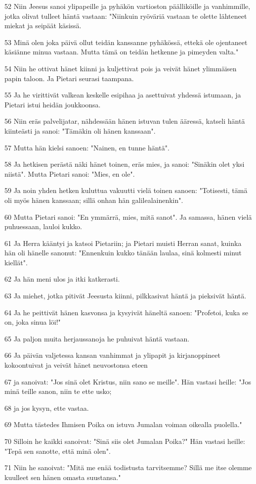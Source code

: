 \par 52 Niin Jeesus sanoi ylipapeille ja pyhäkön vartioston päälliköille ja vanhimmille, jotka olivat tulleet häntä vastaan: "Niinkuin ryöväriä vastaan te olette lähteneet miekat ja seipäät käsissä.
\par 53 Minä olen joka päivä ollut teidän kanssanne pyhäkössä, ettekä ole ojentaneet käsiänne minua vastaan. Mutta tämä on teidän hetkenne ja pimeyden valta."
\par 54 Niin he ottivat hänet kiinni ja kuljettivat pois ja veivät hänet ylimmäisen papin taloon. Ja Pietari seurasi taampana.
\par 55 Ja he virittivät valkean keskelle esipihaa ja asettuivat yhdessä istumaan, ja Pietari istui heidän joukkoonsa.
\par 56 Niin eräs palvelijatar, nähdessään hänen istuvan tulen ääressä, katseli häntä kiinteästi ja sanoi: "Tämäkin oli hänen kanssaan".
\par 57 Mutta hän kielsi sanoen: "Nainen, en tunne häntä".
\par 58 Ja hetkisen perästä näki hänet toinen, eräs mies, ja sanoi: "Sinäkin olet yksi niistä". Mutta Pietari sanoi: "Mies, en ole".
\par 59 Ja noin yhden hetken kuluttua vakuutti vielä toinen sanoen: "Totisesti, tämä oli myös hänen kanssaan; sillä onhan hän galilealainenkin".
\par 60 Mutta Pietari sanoi: "En ymmärrä, mies, mitä sanot". Ja samassa, hänen vielä puhuessaan, lauloi kukko.
\par 61 Ja Herra kääntyi ja katsoi Pietariin; ja Pietari muisti Herran sanat, kuinka hän oli hänelle sanonut: "Ennenkuin kukko tänään laulaa, sinä kolmesti minut kiellät".
\par 62 Ja hän meni ulos ja itki katkerasti.
\par 63 Ja miehet, jotka pitivät Jeesusta kiinni, pilkkasivat häntä ja pieksivät häntä.
\par 64 Ja he peittivät hänen kasvonsa ja kysyivät häneltä sanoen: "Profetoi, kuka se on, joka sinua löi!"
\par 65 Ja paljon muita herjaussanoja he puhuivat häntä vastaan.
\par 66 Ja päivän valjetessa kansan vanhimmat ja ylipapit ja kirjanoppineet kokoontuivat ja veivät hänet neuvostonsa eteen
\par 67 ja sanoivat: "Jos sinä olet Kristus, niin sano se meille". Hän vastasi heille: "Jos minä teille sanon, niin te ette usko;
\par 68 ja jos kysyn, ette vastaa.
\par 69 Mutta tästedes Ihmisen Poika on istuva Jumalan voiman oikealla puolella."
\par 70 Silloin he kaikki sanoivat: "Sinä siis olet Jumalan Poika?" Hän vastasi heille: "Tepä sen sanotte, että minä olen".
\par 71 Niin he sanoivat: "Mitä me enää todistusta tarvitsemme? Sillä me itse olemme kuulleet sen hänen omasta suustansa."

